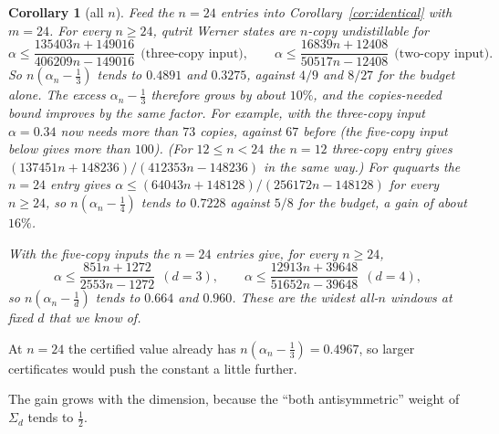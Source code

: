 \documentclass[11pt]{article}
\newtheorem{corollary}[theorem]{Corollary}
\theoremstyle{remark}
\begin{document}
\begin{corollary}[all $n$]
Feed the $n=24$ entries into Corollary~\ref{cor:identical} with $m=24$. For every $n\ge24$, qutrit Werner states are
$n$-copy undistillable for
\[
\alpha\le\frac{135403n+149016}{406209n-149016}\ \ \text{(three-copy input)},\qquad
\alpha\le\frac{16839n+12408}{50517n-12408}\ \ \text{(two-copy input)}.
\]
So $n(\alpha_n-\tfrac13)$ tends to $0.4891$ and $0.3275$, against $4/9$ and $8/27$ for the budget alone. The excess
$\alpha_n-\frac13$ therefore grows by about $10\%$, and the copies-needed bound improves by the same factor. For
example, with the three-copy input $\alpha=0.34$ now needs more than $73$ copies, against $67$ before (the five-copy
input below gives more than $100$). (For $12\le n<24$ the $n=12$ three-copy
entry gives
$(137451n+148236)/(412353n-148236)$ in the same way.) For ququarts the $n=24$ entry gives
$\alpha\le(64043n+148128)/(256172n-148128)$ for every $n\ge24$, so $n(\alpha_n-\frac14)$ tends to $0.7228$ against
$5/8$ for the budget, a gain of about $16\%$.

With the five-copy inputs the $n=24$ entries give, for every $n\ge24$,
\[
\alpha\le\frac{851n+1272}{2553n-1272}\ \ (d=3),\qquad\alpha\le\frac{12913n+39648}{51652n-39648}\ \ (d=4),
\]
so $n(\alpha_n-\frac1d)$ tends to $0.664$ and $0.960$. These are the widest all-$n$ windows at fixed $d$ that we know
of.
\end{corollary}

At $n=24$ the certified value already has $n(\alpha_n-\frac13)=0.4967$, so larger certificates would push the
constant a little further.

The gain grows with the dimension, because the ``both antisymmetric'' weight of $\Sigma_d$ tends to $\frac12$.
\end{document}
